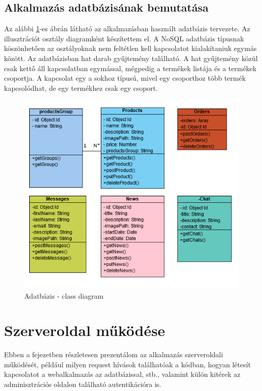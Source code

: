 \subsection{Alkalmazás adatbázisának bemutatása}
Az alábbi \ref{fig.picture-7}-es ábrán látható az alkalmazásban használt adatbázis tervezete. Az illusztrációt osztály diagramként készítettem el. A NoSQL adatbázis típusnak köszönhetően az osztályoknak nem feltétlen kell kapcsolatot kialakítaniuk egymás között. Az adatbázisban hat darab gyűjtemény található. A hat gyűjtemény közül csak kettő áll kapcsolatban egymással, mégpedig a termékek listája és a termékek csoportja. A kapcsolat egy a sokhoz típusú, mivel egy csoporthoz több termék kapcsolódhat, de egy termékhez csak egy csoport.
\begin{figure}[H]
	\centering
	\includegraphics[width=1.0\textwidth]{images/class_diagram.PNG}
	\caption{Adatbázis - class diagram}
	\label{fig.picture-7}
\end{figure}

\section{Szerveroldal működése}

Ebben a fejezetben részletesen prezentálom az alkalmazás szerveroldali működését, például milyen request hívások találhatóak a kódban, hogyan létesít kapcsolatot a webalkalmazás az adatbázissal, stb., valamint külön kitérek az adminisztrációs oldalon található autentikációra is.

